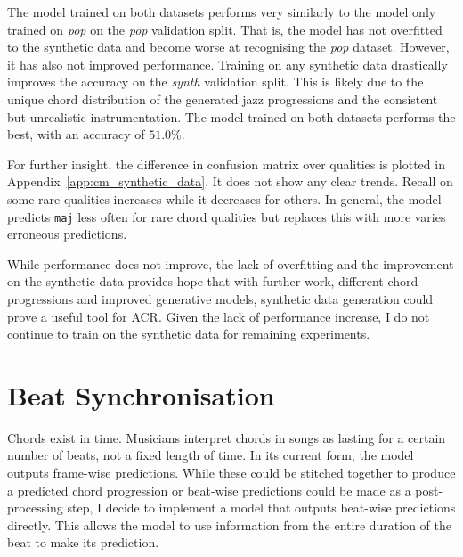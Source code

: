 The model trained on both datasets performs very similarly to the model only trained on \emph{pop} on the \emph{pop} validation split. That is, the model has not overfitted to the synthetic data and become worse at recognising the \emph{pop} dataset. However, it has also not improved performance. Training on any synthetic data drastically improves the accuracy on the \emph{synth} validation split. This is likely due to the unique chord distribution of the generated jazz progressions and the consistent but unrealistic instrumentation. The model trained on both datasets performs the best, with an accuracy of $51.0\%$.

For further insight, the difference in confusion matrix over qualities is plotted in Appendix~\ref{app:cm_synthetic_data}. It does not show any clear trends. Recall on some rare qualities increases while it decreases for others. In general, the model predicts \texttt{maj} less often for rare chord qualities but replaces this with more varies erroneous predictions.

While performance does not improve, the lack of overfitting and the improvement on the synthetic data provides hope that with further work, different chord progressions and improved generative models, synthetic data generation could prove a useful tool for ACR. Given the lack of performance increase, I do not continue to train on the synthetic data for remaining experiments.

\section{Beat Synchronisation}\label{sec:beat-synchronisation}

Chords exist in time. Musicians interpret chords in songs as lasting for a certain number of beats, not a fixed length of time. In its current form, the model outputs frame-wise predictions. While these could be stitched together to produce a predicted chord progression or beat-wise predictions could be made as a post-processing step, I decide to implement a model that outputs beat-wise predictions directly. This allows the model to use information from the entire duration of the beat to make its prediction.

